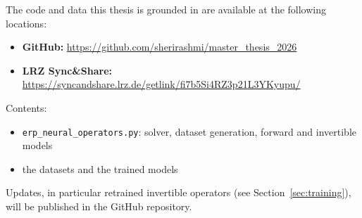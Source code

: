 The code and data this thesis is grounded in are available at the following locations:
\begin{itemize}
  \item \textbf{GitHub:} \url{https://github.com/sherirashmi/master_thesis_2026}
  \item \textbf{LRZ Sync\&Share:} \url{https://syncandshare.lrz.de/getlink/fi7b5Si4RZ3p21L3YKyupu/}
\end{itemize}
Contents:
\begin{itemize}
  \item \texttt{erp\_neural\_operators.py}: solver, dataset generation, forward and invertible models
  \item the datasets and the trained models
\end{itemize}
Updates, in particular retrained invertible operators (see Section~\ref{sec:training}), will be published in the GitHub repository.
